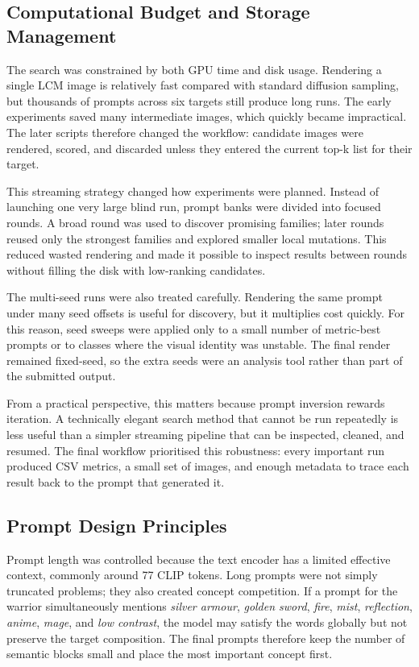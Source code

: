 \documentclass[runningheads]{llncs}
\begin{document}
\subsection{Computational Budget and Storage Management}

The search was constrained by both GPU time and disk usage. Rendering a single LCM image is relatively fast compared with standard diffusion sampling, but thousands of prompts across six targets still produce long runs. The early experiments saved many intermediate images, which quickly became impractical. The later scripts therefore changed the workflow: candidate images were rendered, scored, and discarded unless they entered the current top-k list for their target.

This streaming strategy changed how experiments were planned. Instead of launching one very large blind run, prompt banks were divided into focused rounds. A broad round was used to discover promising families; later rounds reused only the strongest families and explored smaller local mutations. This reduced wasted rendering and made it possible to inspect results between rounds without filling the disk with low-ranking candidates.

The multi-seed runs were also treated carefully. Rendering the same prompt under many seed offsets is useful for discovery, but it multiplies cost quickly. For this reason, seed sweeps were applied only to a small number of metric-best prompts or to classes where the visual identity was unstable. The final render remained fixed-seed, so the extra seeds were an analysis tool rather than part of the submitted output.

From a practical perspective, this matters because prompt inversion rewards iteration. A technically elegant search method that cannot be run repeatedly is less useful than a simpler streaming pipeline that can be inspected, cleaned, and resumed. The final workflow prioritised this robustness: every important run produced CSV metrics, a small set of images, and enough metadata to trace each result back to the prompt that generated it.

\subsection{Prompt Design Principles}

Prompt length was controlled because the text encoder has a limited effective context, commonly around 77 CLIP tokens. Long prompts were not simply truncated problems; they also created concept competition. If a prompt for the warrior simultaneously mentions \emph{silver armour}, \emph{golden sword}, \emph{fire}, \emph{mist}, \emph{reflection}, \emph{anime}, \emph{mage}, and \emph{low contrast}, the model may satisfy the words globally but not preserve the target composition. The final prompts therefore keep the number of semantic blocks small and place the most important concept first.
\end{document}
